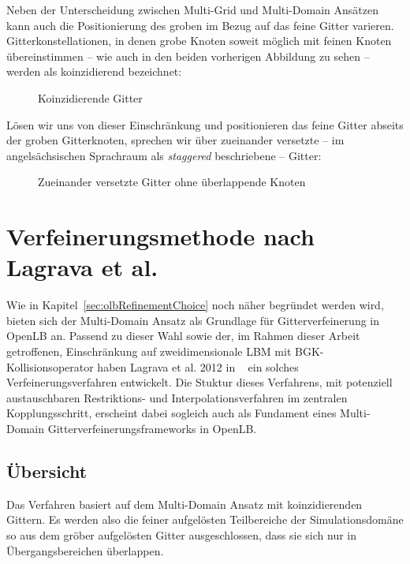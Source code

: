 Neben der Unterscheidung zwischen Multi-Grid und Multi-Domain Ansätzen kann auch die Positionierung des groben im Bezug auf das feine Gitter varieren. Gitterkonstellationen, in denen grobe Knoten soweit möglich mit feinen Knoten übereinstimmen -- wie auch in den beiden vorherigen Abbildung zu sehen -- werden als koinzidierend bezeichnet:

\begin{figure}[h]
\centering

\caption{Koinzidierende Gitter}
\label{fig:CoincidingGrid}
\end{figure}

\noindent
Lösen wir uns von dieser Einschränkung und positionieren das feine Gitter abseits der groben Gitterknoten, sprechen wir über zueinander versetzte -- im angelsächsischen Sprachraum als \emph{staggered} beschriebene -- Gitter:

\begin{figure}[h]
\centering

\caption{Zueinander versetzte Gitter ohne überlappende Knoten}
\label{fig:StaggeredGrid}
\end{figure}

\newpage
\section{Verfeinerungsmethode nach Lagrava et al.}\label{kap:lagrava}

Wie in Kapitel~\ref{sec:olbRefinementChoice} noch näher begründet werden wird, bieten sich der Multi-Domain Ansatz als Grundlage für Gitterverfeinerung in OpenLB an. Passend zu dieser Wahl sowie der, im Rahmen dieser Arbeit getroffenen, Einschränkung auf zweidimensionale LBM mit BGK-Kollisionsoperator haben Lagrava et al. 2012 in ~\cite{lagrava12} ein solches Verfeinerungsverfahren entwickelt. Die Stuktur dieses Verfahrens, mit potenziell austauschbaren Restriktions- und Interpolationsverfahren im zentralen Kopplungsschritt, erscheint dabei sogleich auch als Fundament eines Multi-Domain Gitterverfeinerungsframeworks in OpenLB.

\subsection{Übersicht}

Das Verfahren basiert auf dem Multi-Domain Ansatz \cite[Kap.~3.1]{lagrava12} mit koinzidierenden Gittern. Es werden also die feiner aufgelösten Teilbereiche der Simulationsdomäne so aus dem gröber aufgelösten Gitter ausgeschlossen, dass sie sich nur in Übergangsbereichen überlappen.

